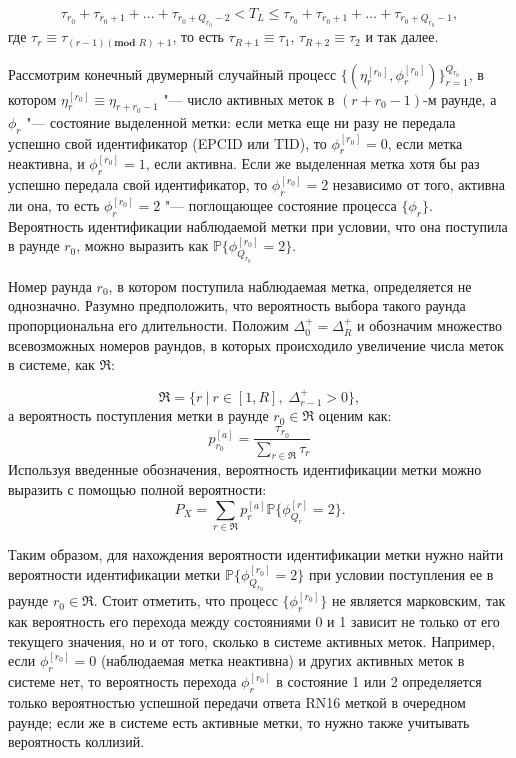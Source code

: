 $$
\tau_{r_0} + \tau_{r_0 + 1} + \dots + \tau_{r_0 + Q_{r_0} - 2} < T_L \leqslant \tau_{r_0} + \tau_{r_0 + 1} + \dots + \tau_{r_0 + Q_{r_0} - 1},
$$
где $\tau_{r} \equiv \tau_{(r - 1)(\textbf{mod } R) + 1}$, то есть $\tau_{R+1} \equiv \tau_1$, $\tau_{R+2} \equiv \tau_2$ и так далее.

Рассмотрим конечный двумерный случайный процесс $\{ (\eta_r^{[r_0]}, \phi_r^{[r_0]}) \}_{r=1}^{Q_{r_0}}$, в котором $\eta_r^{[r_0]} \equiv \eta_{r+r_0-1}$ "--- число активных меток в $(r + r_0 - 1)$-м раунде, а $\phi_r$ "--- состояние выделенной метки: если метка еще ни разу не передала успешно свой идентификатор (EPCID или TID), то $\phi_r^{[r_0]} = 0$, если метка неактивна, и $\phi_r^{[r_0]} = 1$, если активна. Если же выделенная метка хотя бы раз успешно передала свой идентификатор, то $\phi_r^{[r_0]} = 2$ независимо от того, активна ли она, то есть $\phi_r^{[r_0]} = 2$ "--- поглощающее состояние процесса $\{ \phi_r \}$. Вероятность идентификации наблюдаемой метки при условии, что она поступила в раунде $r_0$, можно выразить как $\mathbb{P}\{ \phi_{Q_{r_0}}^{[r_0]} = 2\}$.

Номер раунда $r_0$, в котором поступила наблюдаемая метка, определяется не однозначно. Разумно предположить, что вероятность выбора такого раунда пропорциональна его длительности. Положим $\Delta_0^+ = \Delta_R^+$ и обозначим множество всевозможных номеров раундов, в которых происходило увеличение числа меток в системе, как $\mathfrak{R}$:

$$
	\mathfrak{R} = \{ r\:|\:r \in [1, R],\; \Delta_{r-1}^+ > 0 \},
$$
а вероятность поступления метки в раунде $r_0 \in \mathfrak{R}$ оценим как:
\begin{equation}\label{eq:ch3_fg_prob_arrival}
	p^{[a]}_{r_0} = \frac{\tau_{r_0}}{\sum_{r \in \mathfrak{R}} \tau_r}
\end{equation}
Используя введенные обозначения, вероятность идентификации метки можно выразить с помощью полной вероятности:
\begin{equation}\label{eq:ch3_tag_id_prob_phi}
	P_X = \sum\limits_{r \in \mathfrak{R}} p^{[a]}_r \mathbb{P}\{ \phi^{[r]}_{Q_r} = 2 \}.
\end{equation}

Таким образом, для нахождения вероятности идентификации метки нужно найти вероятности идентификации метки $\mathbb{P}\{ \phi^{[r_0]}_{Q_{r_0}} = 2 \}$ при условии поступления ее в раунде $r_0 \in \mathfrak{R}$. Стоит отметить, что процесс $\{ \phi^{[r_0]}_r \}$ не является марковским, так как вероятность его перехода между состояниями 0 и 1 зависит не только от его текущего значения, но и от того, сколько в системе активных меток. Например, если $\phi_r^{[r_0]} = 0$ (наблюдаемая метка неактивна) и других активных меток в системе нет, то вероятность перехода $\phi_r^{[r_0]}$ в состояние 1 или 2 определяется только вероятностью успешной передачи ответа RN16 меткой в очередном раунде; если же в системе есть активные метки, то нужно также учитывать вероятность коллизий.



